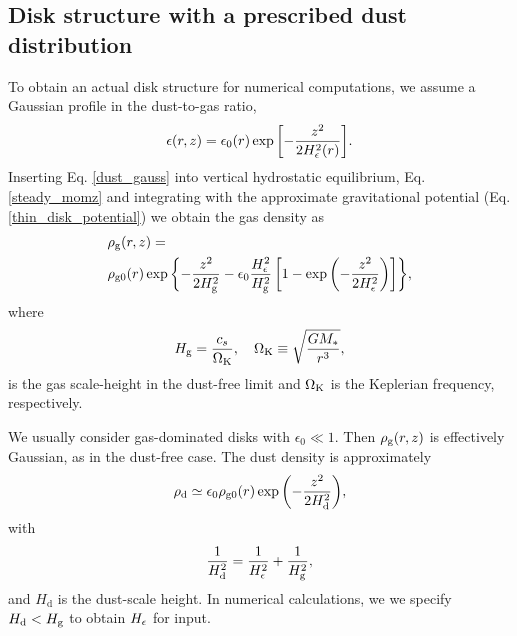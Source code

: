 
\subsection{Disk structure with a prescribed dust distribution}\label{steady_state}  
To obtain an actual disk structure for numerical computations, we
assume a Gaussian profile in the dust-to-gas ratio,   
\begin{align}\label{dust_gauss}
  \epsilon(r,z) = \epsilon_0(r)
  \exp{\left[-\frac{z^2}{2H_\epsilon^2(r)}\right]}. 
\end{align}
Inserting Eq. \ref{dust_gauss} into vertical hydrostatic equilibrium,
Eq. \ref{steady_momz} and integrating with the approximate
gravitational potential (Eq. \ref{thin_disk_potential}) we obtain the
gas density as
\begin{align}
  &\rho_\mathrm{g}(r,z)= \notag\\
&\rho_\mathrm{g0}(r)\exp{\left\{ - \frac{z^2}{2H_\mathrm{g}^2}
    -\epsilon_0\frac{H_\epsilon^2}{H_\mathrm{g}^2}\left[1 -
      \exp{\left(-\frac{z^2}{2H_\epsilon^2}\right)}\right] \right\}}, 
\end{align}
where
\begin{align}
  H_\mathrm{g} = \frac{c_s}{\Omega_{\rm K}}, \quad \Omega_{\rm K} \equiv \sqrt{\frac{GM_*}{r^3}},   
\end{align}
is the gas scale-height in the dust-free limit and $\Omega_{\rm K}$ is the
Keplerian frequency, respectively. 

We usually consider gas-dominated disks with $\epsilon_0 \ll 1$.  
Then $\rho_\mathrm{g}(r,z)$ is effectively Gaussian, as in the 
dust-free case. The dust density is approximately 
\begin{align}
  \rho_\mathrm{d} \simeq \epsilon_0\rho_\mathrm{g0}(r) \exp
        {\left(-\frac{z^2}{2H_\mathrm{d}^2}\right)}, 
\end{align}
with 
\begin{align}
  \frac{1}{H_\mathrm{d}^2} = \frac{1}{H_\epsilon^2} + \frac{1}{H_\mathrm{g}^2}, 
\end{align}
and $H_\mathrm{d}$ is the dust-scale height. In numerical
calculations, we  we specify $H_\mathrm{d}< H_\mathrm{g}$ to obtain 
$H_\epsilon$ for input. 

